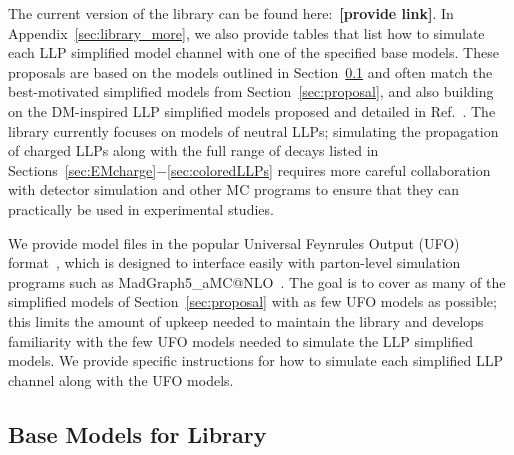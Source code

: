 The current version of the library can be found here:~{\bf [provide link]}.
In Appendix~\ref{sec:library_more}, we also provide tables that list how to simulate each LLP simplified model channel with one of the specified base models.
These proposals are based on the models outlined in Section~\ref{sec:base} and often match the best-motivated simplified models from Section~\ref{sec:proposal}, and also building on the DM-inspired LLP simplified models proposed and detailed in Ref.~\cite{Buchmueller:2017uqu}.
The library currently focuses on models of neutral LLPs; simulating the propagation of charged LLPs along with the full range of decays listed in Sections~\ref{sec:EMcharge}$-$\ref{sec:coloredLLPs} requires more careful collaboration with detector simulation and other MC programs to ensure that they can practically be used in experimental studies.

We provide model files in the popular Universal Feynrules Output (UFO) format~\cite{Degrande:2011ua}, which is designed to interface easily with parton-level simulation programs such as MadGraph5\_aMC@NLO~\cite{Alwall:2014hca}.
The goal is to cover as many of the simplified models of Section~\ref{sec:proposal} with as few UFO models as possible; this limits the amount of upkeep needed to maintain the library and develops familiarity with the few UFO models needed to simulate the LLP simplified models.
We provide specific instructions for how to simulate each simplified LLP channel along with the UFO models. 

\subsection{Base Models for Library}\label{sec:base}

